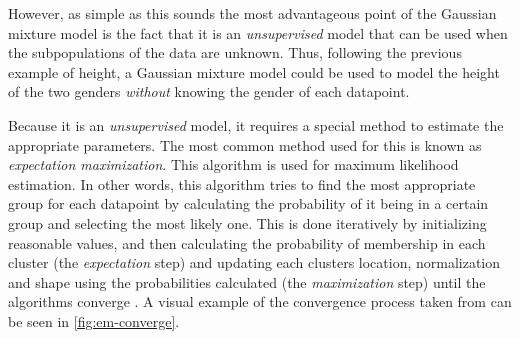 \documentclass
[
    a4paper,
    twoside,
    12pt,
]
{report}
\begin{document}
However, as simple as this sounds the most advantageous point of the
Gaussian mixture model is the fact that it is an \emph{unsupervised}
model that can be used when the subpopulations of the data are unknown.
Thus, following the previous example of height, a Gaussian mixture model
could be used to model the height of the two genders \emph{without}
knowing the gender of each datapoint.

Because it is an \emph{unsupervised} model, it requires a special method
to estimate the appropriate parameters. The most common method used for
this is known as \emph{expectation maximization}. This algorithm is used
for maximum likelihood estimation. In other words, this algorithm tries
to find the most appropriate group for each datapoint by calculating the
probability of it being in a certain group and selecting the most likely
one. This is done iteratively by initializing reasonable values, and
then calculating the probability of membership in each cluster (the
\emph{expectation} step) and updating each clusters location,
normalization and shape using the probabilities calculated (the
\emph{maximization} step) until the algorithms converge
\parencite{vanderplas2016}. A visual example of the convergence process
taken from \textcite{mcgonagle2016} can be seen in
\autoref{fig:em-converge}.
\end{document}

